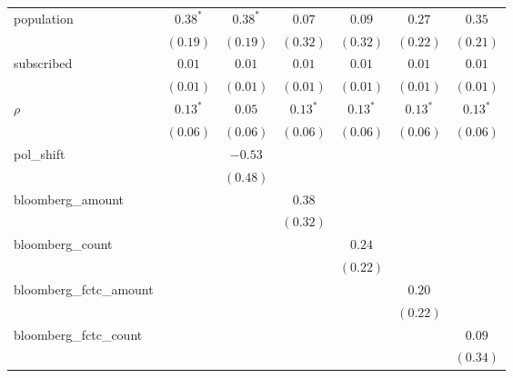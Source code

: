\begin{table}[!h]
\begin{center}
\begin{tabular}{l c c c c c c }
population              & $0.38^{*}$    & $0.38^{*}$   & $0.07$        & $0.09$        & $0.27$        & $0.35$        \\
                        & $(0.19)$      & $(0.19)$     & $(0.32)$      & $(0.32)$      & $(0.22)$      & $(0.21)$      \\
subscribed              & $0.01$        & $0.01$       & $0.01$        & $0.01$        & $0.01$        & $0.01$        \\
                        & $(0.01)$      & $(0.01)$     & $(0.01)$      & $(0.01)$      & $(0.01)$      & $(0.01)$      \\
$\rho$                  & $0.13^{*}$    & $0.05$       & $0.13^{*}$    & $0.13^{*}$    & $0.13^{*}$    & $0.13^{*}$    \\
                        & $(0.06)$      & $(0.06)$     & $(0.06)$      & $(0.06)$      & $(0.06)$      & $(0.06)$      \\
pol\_shift              &               & $-0.53$      &               &               &               &               \\
                        &               & $(0.48)$     &               &               &               &               \\
bloomberg\_amount       &               &              & $0.38$        &               &               &               \\
                        &               &              & $(0.32)$      &               &               &               \\
bloomberg\_count        &               &              &               & $0.24$        &               &               \\
                        &               &              &               & $(0.22)$      &               &               \\
bloomberg\_fctc\_amount &               &              &               &               & $0.20$        &               \\
                        &               &              &               &               & $(0.22)$      &               \\
bloomberg\_fctc\_count  &               &              &               &               &               & $0.09$        \\
                        &               &              &               &               &               & $(0.34)$      \\
\midrule

\end{tabular}
\end{center}
\end{table}
